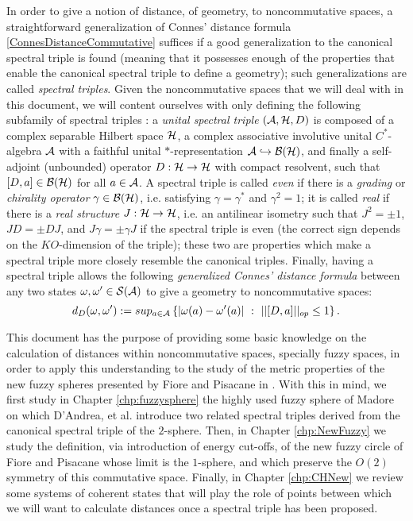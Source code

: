 In order to give a notion of distance, of geometry, to noncommutative spaces, a straightforward generalization of Connes' distance formula \eqref{ConnesDistanceCommutative} suffices if a good generalization to the canonical spectral triple is found (meaning that it possesses enough of the properties that enable the canonical spectral triple to define a geometry); such generalizations are called \emph{spectral triples}. Given the noncommutative spaces that we will deal with in this document, we will content ourselves with only defining the following subfamily of spectral triples \cite{DAndrea2013}: a \emph{unital spectral triple} $(\mathcal A, \mathcal H, D)$ is composed of a complex separable Hilbert space $\mathcal H$, a complex associative involutive unital $C^*$-algebra $\mathcal A$ with a faithful unital $*$-representation $\mathcal A \hookrightarrow \mathcal B(\mathcal H)$, and finally a self-adjoint (unbounded) operator $D:\mathcal H \to \mathcal H$ with compact resolvent, such that $[D, a]\in \mathcal B(\mathcal H)$ for all $a \in \mathcal A$. A spectral triple is called \emph{even} if there is a \emph{grading} or \emph{chirality operator} $\gamma \in \mathcal B(\mathcal H)$, i.e. satisfying $\gamma = \gamma^*$ and $\gamma^2 = 1$; it is called \emph{real} if there is a \emph{real structure} $J: \mathcal H \to \mathcal H$, i.e. an antilinear isometry such that $J^2 = \pm 1$, $JD = \pm DJ $, and $J\gamma = \pm \gamma J$ if the spectral triple is even (the correct sign depends on the $KO$-dimension of the triple); these two are properties which make a spectral triple more closely resemble the canonical triples. Finally, having a spectral triple allows the following \emph{generalized Connes' distance formula} between any two states $\omega, \omega' \in \mathcal S(\mathcal A)$ to give a geometry to noncommutative spaces:
\begin{equation}\label{ConnesDistanceFormula}
    d_D(\omega, \omega') := sup_{a \in \mathcal A} \left\{|\omega(a) - \omega'(a)| \, \,:\, \, ||[D, a]||_{op} \leq 1 \right\}.
\end{equation}
 
This document has the purpose of providing some basic knowledge on the calculation of distances within noncommutative spaces, specially fuzzy spaces, in order to apply this understanding to the study of the metric properties of the new fuzzy spheres presented by Fiore and Pisacane in \cite{Fiore2018}. With this in mind, we first study in Chapter \ref{chp:fuzzysphere} the highly used fuzzy sphere of Madore \cite{Madore} on which D'Andrea, et al. \cite{DAndrea2013} introduce two related spectral triples derived from the canonical spectral triple of the $2$-sphere. Then, in Chapter \ref{chp:NewFuzzy} we study the definition, via introduction of energy cut-offs, of the new fuzzy circle of Fiore and Pisacane whose limit is the $1$-sphere, and which preserve the $O(2)$ symmetry of this commutative space. Finally, in Chapter \ref{chp:CHNew} we review some systems of coherent states that will play the role of points between which we will want to calculate distances once a spectral triple has been proposed.

